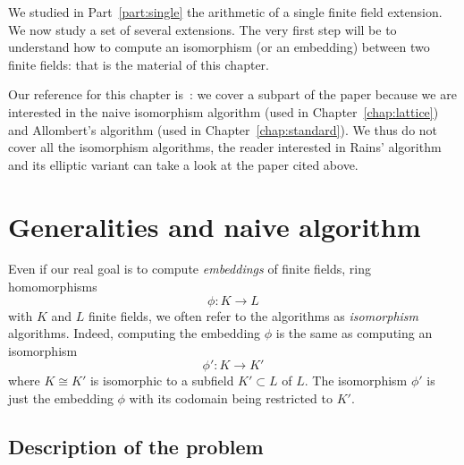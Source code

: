 We studied in Part~\ref{part:single} the arithmetic of a single finite field
extension. We now study a set of several extensions. The very first step will be
to understand how to compute an isomorphism (or an embedding) between two finite
fields: that is the material of this chapter.
\minitoc


\clearpage

Our reference for this chapter is~\cite{BDDFS17}: we cover a subpart of the
paper because we are interested in the naive isomorphism algorithm (used in
Chapter~\ref{chap:lattice}) and Allombert's algorithm (used in
Chapter~\ref{chap:standard}). We thus do not cover all the isomorphism
algorithms, the reader interested in Rains' algorithm and its elliptic variant
can take a look at the paper cited above.

\section{Generalities and naive algorithm}

Even if our real goal is to compute \emph{embeddings} of finite fields, \ie
ring homomorphisms
\[
  \phi:K\to L
\]
with $K$ and $L$ finite fields, we often refer to the algorithms as
\emph{isomorphism} algorithms. Indeed, computing the embedding $\phi$ is
the same as computing an isomorphism
\[
  \phi':K\to K'
\]
where $K\cong K'$ is isomorphic to a subfield $K'\subset L$ of $L$. The
isomorphism $\phi'$ is just the embedding $\phi$ with its codomain being
restricted to $K'$.

\subsection{Description of the problem}

